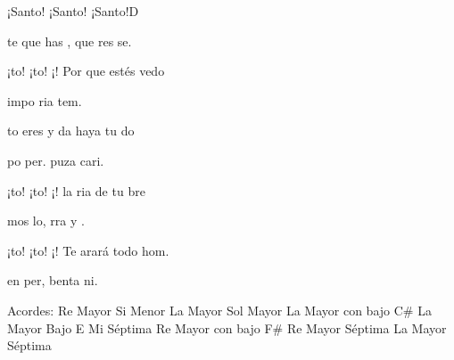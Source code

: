 \documentclass[12pt, spanish]{book}
\begin{document}
\begin{song}{¡Santo! ¡Santo! ¡Santo!}{D}
\begin{SBOpGroup}
            te  que has , que res  se.
        \end{SBOpGroup}
        \vskip 20pt
        \begin{SBOpGroup}
            ¡to! ¡to! ¡! Por  que estés vedo

             impo   ria tem.

            to  eres  y da haya tu do

             po per. puza  cari.
        \end{SBOpGroup}
        \vskip 20pt
        \begin{SBOpGroup}
            ¡to! ¡to! ¡! la ria de tu bre

            mos     lo, rra y .

            ¡to! ¡to! ¡! Te arará todo hom.

             en  per, benta ni.
        \end{SBOpGroup}

        \ifChordBk
        \begin{SBOpGroup}
            Acordes:
            \upchord{\D}\qquad Re Mayor \hfill
            \upchord{\Bm}\qquad\qquad Si Menor \hfill\null\break
            \upchord{\A}\qquad La Mayor \hfill
            \upchord{\G}\qquad Sol Mayor \hfill\null\break
            \upchord{\ACs}La Mayor con bajo C\# \hfill\null\break
            \upchord{\AEg}La Mayor Bajo E \hfill\null\break
            \upchord{\Eseven}\qquad Mi S\'eptima \hfill
            \upchord{\DFs}\qquad Re Mayor con bajo F\# \hfill\null\break
            \upchord{\Dseven}\qquad Re Mayor S\'eptima \hfill
            \upchord{\Aseven}La Mayor S\'eptima \hfill
        \end{SBOpGroup}
        \fi
    \end{song}

    \ifChordBk
        
        \theendnotes
        
        
        
    \fi

    
\end{document}
